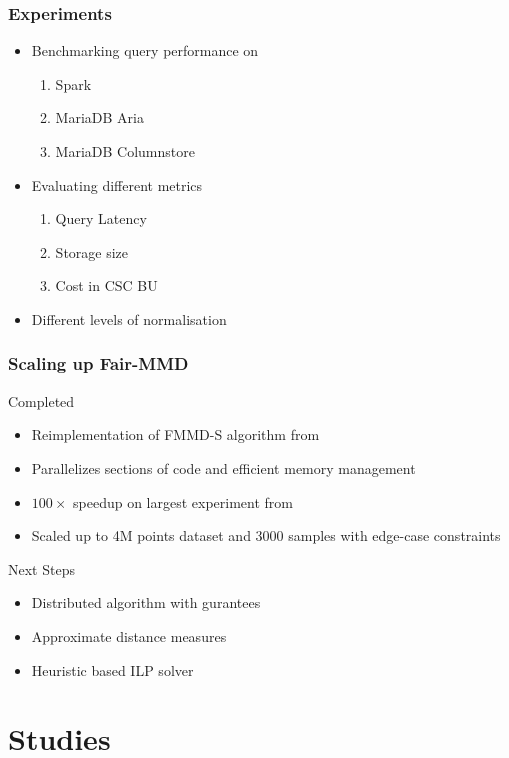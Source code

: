 \documentclass[pdf]{beamer}
\begin{document}
\begin{frame}
    \frametitle{Experiments}
    \begin{itemize}
        \item Benchmarking query performance on
        \begin{enumerate}
            \item Spark
            \item MariaDB Aria
            \item MariaDB Columnstore
        \end{enumerate}
        \item Evaluating different metrics
        \begin{enumerate}
            \item Query Latency
            \item Storage size
            \item Cost in CSC BU    
        \end{enumerate}
        \item Different levels of normalisation 
    \end{itemize}
    

\end{frame}



\begin{frame}
    \frametitle{Scaling up Fair-MMD}
    Completed
    \begin{itemize}
        \item Reimplementation of FMMD-S algorithm from \cite{wang2023fmmd}
        \item Parallelizes sections of code and efficient memory management
        \item $100\times$ speedup on largest experiment from \cite{wang2023fmmd}
        \item Scaled up to 4M points dataset and 3000 samples with edge-case constraints
    \end{itemize}
    Next Steps
    \begin{itemize}
        \item Distributed algorithm with gurantees
        \item Approximate distance measures
        \item Heuristic based ILP solver
    \end{itemize}
\end{frame}

\section{Studies}
\end{document}
